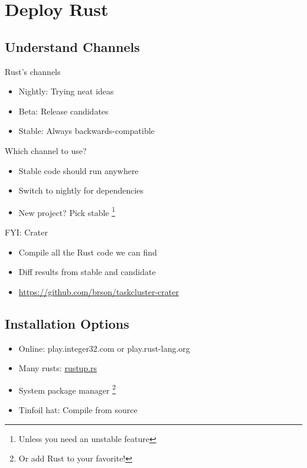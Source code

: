 \documentclass[xcolor={svgnames},hyperref]{beamer}
\begin{document}
\section{Deploy Rust}



    \subsection{Understand Channels}

    \begin{frame}
        Rust's channels
        \begin{itemize}
            \item Nightly: Trying neat ideas
            \item Beta: Release candidates
            \item Stable: Always backwards-compatible
        \end{itemize}
    \end{frame}

    \begin{frame}
        Which channel to use?
        \begin{itemize}
            \item Stable code should run anywhere
            \item Switch to nightly for dependencies
            \item New project? Pick stable \footnote{Unless you need an
                  unstable feature}
        \end{itemize}
    \end{frame}

    \begin{frame}
        FYI: Crater
        \begin{itemize}
            \item Compile all the Rust code we can find
            \item Diff results from stable and candidate
            \item \url{https://github.com/brson/taskcluster-crater}
        \end{itemize}
    \end{frame}

    \subsection{Installation Options}

    \begin{frame}
        \begin{itemize}
            \item Online: play.integer32.com or play.rust-lang.org
            \item Many rusts: \url{rustup.rs}
            \item System package manager \footnote{Or add Rust to your favorite!}
            \item Tinfoil hat: Compile from source
        \end{itemize}
    \end{frame}
\end{document}
